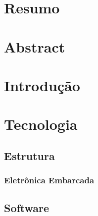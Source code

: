 \chapter{Resumo} %


\chapter{Abstract} %




\chapter{Introdução} %


\chapter{Tecnologia}

\section{Estrutura} %


\subsection{Eletrônica Embarcada} %


\section{Software} %

